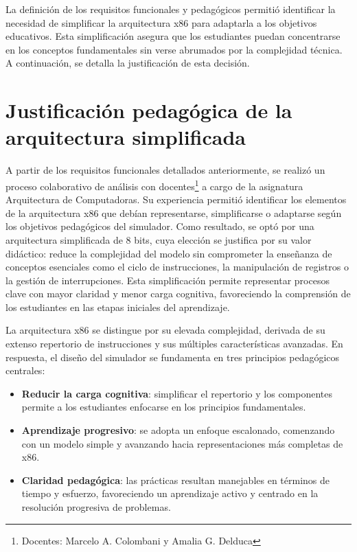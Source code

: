 \documentclass[12pt,oneside]{templates/unerthesis}
\providecommand{\tightlist}{%
  \setlength{\itemsep}{0pt}\setlength{\parskip}{0pt}}
\begin{document}
La definición de los requisitos funcionales y pedagógicos permitió identificar la necesidad de simplificar la arquitectura x86 para adaptarla a los objetivos educativos. Esta simplificación asegura que los estudiantes puedan concentrarse en los conceptos fundamentales sin verse abrumados por la complejidad técnica. A continuación, se detalla la justificación de esta decisión.

\hypertarget{justificaciuxf3n-pedaguxf3gica-de-la-arquitectura-simplificada}{%
\section{Justificación pedagógica de la arquitectura simplificada}\label{justificaciuxf3n-pedaguxf3gica-de-la-arquitectura-simplificada}}

A partir de los requisitos funcionales detallados anteriormente, se realizó un proceso colaborativo de análisis con docentes\footnote{Docentes: Marcelo A. Colombani y Amalia G. Delduca} a cargo de la asignatura Arquitectura de Computadoras. Su experiencia permitió identificar los elementos de la arquitectura x86 que debían representarse, simplificarse o adaptarse según los objetivos pedagógicos del simulador. Como resultado, se optó por una arquitectura simplificada de 8 bits, cuya elección se justifica por su valor didáctico: reduce la complejidad del modelo sin comprometer la enseñanza de conceptos esenciales como el ciclo de instrucciones, la manipulación de registros o la gestión de interrupciones. Esta simplificación permite representar procesos clave con mayor claridad y menor carga cognitiva, favoreciendo la comprensión de los estudiantes en las etapas iniciales del aprendizaje.

La arquitectura x86 se distingue por su elevada complejidad, derivada de su extenso repertorio de instrucciones y sus múltiples características avanzadas. En respuesta, el diseño del simulador se fundamenta en tres principios pedagógicos centrales:

\begin{itemize}
\tightlist
\item
  \textbf{Reducir la carga cognitiva}: simplificar el repertorio y los componentes permite a los estudiantes enfocarse en los principios fundamentales.\\
\item
  \textbf{Aprendizaje progresivo}: se adopta un enfoque escalonado, comenzando con un modelo simple y avanzando hacia representaciones más completas de x86.\\
\item
  \textbf{Claridad pedagógica}: las prácticas resultan manejables en términos de tiempo y esfuerzo, favoreciendo un aprendizaje activo y centrado en la resolución progresiva de problemas.
\end{itemize}
\end{document}
